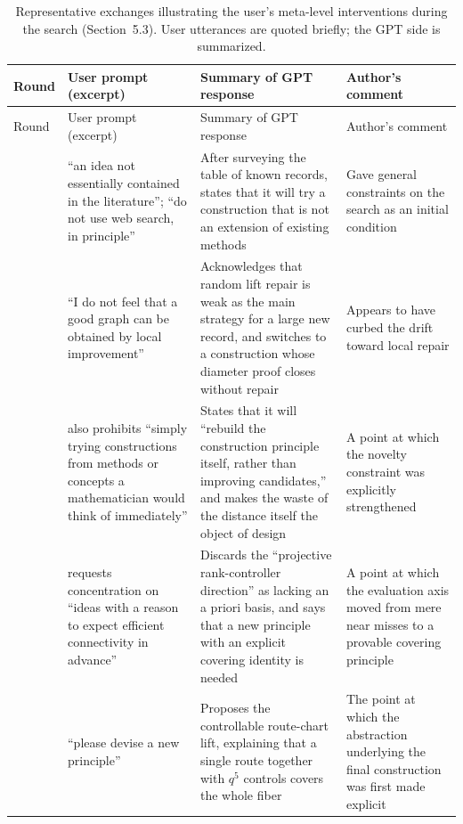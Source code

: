\documentclass[11pt]{article}
\theoremstyle{definition}
\theoremstyle{remark}
\renewcommand{\_}{\textunderscore\allowbreak}
\begin{document}
{\small
\setlength{\LTleft}{0pt}\setlength{\LTright}{\fill}
\begin{longtable}{>{\raggedright\arraybackslash}p{}>{\raggedright\arraybackslash}p{}>{\raggedright\arraybackslash}p{}>{\raggedright\arraybackslash}p{}}
\caption{Representative exchanges illustrating the user's meta-level interventions during the search (Section~5.3). User utterances are quoted briefly; the GPT side is summarized.}\label{tab:interventions}\\
\toprule
Round & User prompt (excerpt) & Summary of GPT response & Author's comment \\
\midrule
\endfirsthead
\toprule
Round & User prompt (excerpt) & Summary of GPT response & Author's comment \\
\midrule
\endhead
\bottomrule
\endlastfoot
001 & ``an idea not essentially contained in the literature''; ``do not use web search, in principle'' & After surveying the table of known records, states that it will try a construction that is not an extension of existing methods & Gave general constraints on the search as an initial condition \\
\midrule
003 & ``I do not feel that a good graph can be obtained by local improvement'' & Acknowledges that random lift repair is weak as the main strategy for a large new record, and switches to a construction whose diameter proof closes without repair & Appears to have curbed the drift toward local repair \\
\midrule
017 & also prohibits ``simply trying constructions from methods or concepts a mathematician would think of immediately'' & States that it will ``rebuild the construction principle itself, rather than improving candidates,'' and makes the waste of the distance itself the object of design & A point at which the novelty constraint was explicitly strengthened \\
\midrule
022 & requests concentration on ``ideas with a reason to expect efficient connectivity in advance'' & Discards the ``projective rank-controller direction'' as lacking an a priori basis, and says that a new principle with an explicit covering identity is needed & A point at which the evaluation axis moved from mere near misses to a provable covering principle \\
\midrule
023 & ``please devise a new principle'' & Proposes the controllable route-chart lift, explaining that a single route together with \(q^5\) controls covers the whole fiber & The point at which the abstraction underlying the final construction was first made explicit \\

\end{longtable}}
\end{document}
